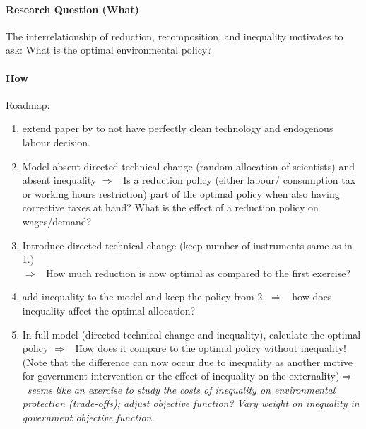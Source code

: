 \documentclass[12pt]{article}
\newcommand{\ar}{$\Rightarrow$ \ }
\begin{document}
\paragraph{Research Question (What)}

The interrelationship of reduction, recomposition, and inequality motivates to ask: What is the optimal environmental policy? 
 
\paragraph{How}
\underline{Roadmap}: 
\begin{enumerate}
	\item extend paper by \cite{Acemoglu2012TheChange, Fried2018ClimateAnalysis, Acemoglu2016TransitionTechnology} to not have perfectly clean technology and endogenous labour decision.
\item Model absent directed technical change (random allocation of scientists) and absent inequality \ar Is a reduction policy  (either labour/ consumption tax or working hours restriction) part of the optimal policy when also having corrective taxes at hand? What is the effect of a reduction policy on wages/demand? 
\item Introduce directed technical change (keep number of instruments same as in 1.) \\ \ar How much reduction is now optimal as compared to the first exercise?
\item add inequality to the model and keep the policy from 2. \ar how does inequality affect the optimal allocation?
\item In full model (directed technical change and inequality), calculate the optimal policy \ar How does it compare to the optimal policy without inequality! (Note that the difference can now occur due to inequality as another motive for government intervention or the effect of inequality on the externality)\ar \textit{seems like an exercise to study the costs of inequality on environmental protection (trade-offs); adjust objective function? Vary weight on inequality in government objective function. }


\end{enumerate}
\end{document}

